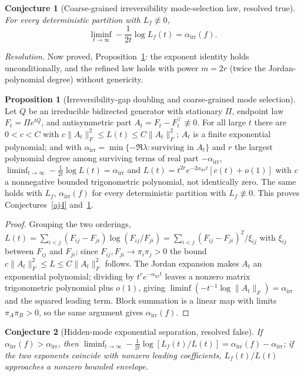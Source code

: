 \documentclass[11pt]{article}
\newtheorem{conjecture}{Conjecture}
\theoremstyle{definition}
\newtheorem{proposition}{Proposition}
\begin{document}
\begin{conjecture}[Coarse-grained irreversibility mode-selection law, resolved true]\label{aj6}
For every deterministic partition with $L_f\not\equiv0$,
\[
\liminf_{t\to\infty}-\frac1{2t}\log L_f(t)=\alpha_{\mathrm{irr}}(f).
\]
\end{conjecture}

\emph{Resolution.} Now proved, Proposition~\ref{aj:doubling}: the exponent identity holds unconditionally, and the refined law holds with power $m=2r$ (twice the Jordan-polynomial degree) without genericity.

\begin{proposition}[Irreversibility-gap doubling and coarse-grained mode selection]\label{aj:doubling}
Let $Q$ be an irreducible bidirected generator with stationary $\Pi$, endpoint law $F_t=\Pi e^{tQ}$, and antisymmetric part $A_t=F_t-F_t^\top\not\equiv0$.  For all large $t$ there are $0<c<C$ with $c\|A_t\|_F^2\le L(t)\le C\|A_t\|_F^2$; $A_t$ is a finite exponential polynomial; and with $\alpha_{\mathrm{irr}}=\min\{-\Re\lambda:\text{surviving in }A_t\}$ and $r$ the largest polynomial degree among surviving terms of real part $-\alpha_{\mathrm{irr}}$, $\liminf_{t\to\infty}-\tfrac1{2t}\log L(t)=\alpha_{\mathrm{irr}}$ and $L(t)=t^{2r}e^{-2\alpha_{\mathrm{irr}}t}[c(t)+o(1)]$ with $c$ a nonnegative bounded trigonometric polynomial, not identically zero.  The same holds with $L_f$, $\alpha_{\mathrm{irr}}(f)$ for every deterministic partition with $L_f\not\equiv0$.  This proves Conjectures~\ref{aj4} and~\ref{aj6}.
\end{proposition}

\begin{proof}
Grouping the two orderings, $L(t)=\sum_{i<j}(F_{ij}-F_{ji})\log(F_{ij}/F_{ji})=\sum_{i<j}(F_{ij}-F_{ji})^2/\xi_{ij}$ with $\xi_{ij}$ between $F_{ij}$ and $F_{ji}$; since $F_{ij},F_{ji}\to\pi_i\pi_j>0$ the bound $c\|A_t\|_F^2\le L\le C\|A_t\|_F^2$ follows.  The Jordan expansion makes $A_t$ an exponential polynomial; dividing by $t^re^{-\alpha_{\mathrm{irr}}t}$ leaves a nonzero matrix trigonometric polynomial plus $o(1)$, giving $\liminf(-t^{-1}\log\|A_t\|_F)=\alpha_{\mathrm{irr}}$ and the squared leading term.  Block summation is a linear map with limits $\pi_A\pi_B>0$, so the same argument gives $\alpha_{\mathrm{irr}}(f)$.
\end{proof}

\begin{conjecture}[Hidden-mode exponential separation, resolved false]\label{aj7}
If $\alpha_{\mathrm{irr}}(f)>\alpha_{\mathrm{irr}}$, then $\liminf_{t\to\infty}-\tfrac1{2t}\log[L_f(t)/L(t)]=\alpha_{\mathrm{irr}}(f)-\alpha_{\mathrm{irr}}$; if the two exponents coincide with nonzero leading coefficients, $L_f(t)/L(t)$ approaches a nonzero bounded envelope.
\end{conjecture}
\end{document}
